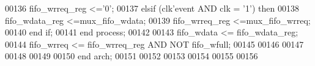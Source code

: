 \begin{DoxyCode}
00136       \textcolor{vhdlchar}{fifo_wrreq_reg} \textcolor{vhdlchar}{<=}\textcolor{vhdlchar}{'}\textcolor{vhdllogic}{}\textcolor{vhdllogic}{0}\textcolor{vhdlchar}{'};
00137    \textcolor{keywordflow}{elsif} \textcolor{vhdlchar}{(}\textcolor{vhdlchar}{clk}\textcolor{vhdlchar}{'}\textcolor{vhdlkeyword}{event} \textcolor{keywordflow}{AND} \textcolor{vhdlchar}{clk} \textcolor{vhdlchar}{=} \textcolor{vhdlchar}{'}\textcolor{vhdllogic}{}\textcolor{vhdllogic}{1}\textcolor{vhdlchar}{'}\textcolor{vhdlchar}{)} \textcolor{keywordflow}{then} 
00138       \textcolor{vhdlchar}{fifo_wdata_reg} \textcolor{vhdlchar}{<=}\textcolor{vhdlchar}{mux_fifo_wdata};
00139       \textcolor{vhdlchar}{fifo_wrreq_reg} \textcolor{vhdlchar}{<=}\textcolor{vhdlchar}{mux_fifo_wrreq};
00140    \textcolor{keywordflow}{end} \textcolor{keywordflow}{if};
00141 \textcolor{keywordflow}{end} \textcolor{keywordflow}{process};
00142 
00143 \textcolor{vhdlchar}{fifo_wdata} \textcolor{vhdlchar}{<=} \textcolor{vhdlchar}{fifo_wdata_reg};
00144 \textcolor{vhdlchar}{fifo_wrreq} \textcolor{vhdlchar}{<=} \textcolor{vhdlchar}{fifo_wrreq_reg} \textcolor{keywordflow}{AND} \textcolor{keywordflow}{NOT} \textcolor{vhdlchar}{fifo_wfull};
00145 
00146 
00147 
00148 
00149   
00150 \textcolor{keywordflow}{end} \textcolor{vhdlchar}{arch};   
00151 
00152 
00153 
00154 
00155 
00156 
\end{DoxyCode}

